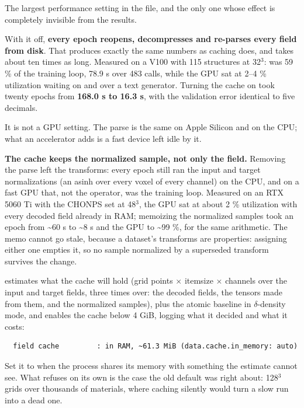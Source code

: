 The largest performance setting in the file, and the only one whose effect is completely invisible from the results.

With it off, \textbf{every epoch reopens, decompresses and re-parses every field from disk}. That produces exactly the same numbers as caching does, and takes about ten times as long. Measured on a V100 with 115 structures at 32$^3$:  was 59 \% of the training loop, 78.9 s over 483 calls, while the GPU sat at 2--4 \% utilization waiting on  and  over a text generator. Turning the cache on took twenty epochs from \textbf{168.0 s to 16.3 s}, with the validation error identical to five decimals.

It is not a GPU setting. The parse is the same on Apple Silicon and on the CPU; what an accelerator adds is a fast device left idle by it.

\textbf{The cache keeps the normalized sample, not only the field.} Removing the parse left the transforms: every epoch still ran the input and target normalizations (an asinh over every voxel of every channel) on the CPU, and on a fast GPU that, not the operator, was the training loop. Measured on an RTX 5060 Ti with the CHONPS set at 48$^3$, the GPU sat at about 2 \% utilization with every decoded field already in RAM; memoizing the normalized samples took an epoch from \textasciitilde{}60 s to \textasciitilde{}8 s and the GPU to \textasciitilde{}99 \%, for the same arithmetic. The memo cannot go stale, because a dataset's transforms are properties: assigning either one empties it, so no sample normalized by a superseded transform survives the change.

 estimates what the cache will hold (grid points $\times$ itemsize $\times$ channels over the input and target fields, three times over: the decoded fields, the tensors made from them, and the normalized samples), plus the atomic baseline in $\delta$-density mode, and enables the cache below 4 GiB, logging what it decided and what it costs:

\begin{lstlisting}
  field cache         : in RAM, ~61.3 MiB (data.cache.in_memory: auto)
\end{lstlisting}

Set it to  when the process shares its memory with something the estimate cannot see. What  refuses on its own is the case the old default was right about: 128$^3$ grids over thousands of materials, where caching silently would turn a slow run into a dead one.

